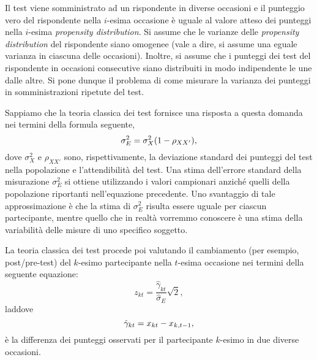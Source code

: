 Il test viene somministrato ad un rispondente in diverse occasioni e il punteggio vero del rispondente nella $i$-esima occasione è uguale al valore atteso dei punteggi nella $i$-esima \emph{propensity distribution}.
Si assume che le varianze delle \emph{propensity distribution} del rispondente siano omogenee (vale a dire, si assume una eguale varianza in ciascuna delle occasioni). 
Inoltre, si assume che i punteggi dei test del rispondente in occasioni consecutive siano distribuiti in modo indipendente le une dalle altre.
Si pone dunque il problema di come misurare la varianza dei punteggi in somministrazioni ripetute del test.

Sappiamo che la teoria classica dei test fornisce una risposta a questa domanda nei termini della formula seguente, 
\begin{equation}
\sigma^2_E = \sigma^2_X (1 - \rho_{XX'}), \notag
\end{equation}
dove $\sigma^2_X$ e $\rho_{XX'}$ sono, rispettivamente, la deviazione standard dei punteggi del test nella popolazione e l'attendibilità del test.
Una stima dell'errore standard della misurazione $\sigma^2_E$ si ottiene utilizzando i valori campionari anziché quelli della popolazione riportanti nell'equazione precedente.
Uno svantaggio di tale approssimazione è che la stima di $\sigma^2_E$ risulta essere uguale per ciascun partecipante, mentre quello che in realtà vorremmo conoscere è una stima della variabilità delle misure di uno specifico soggetto.

La teoria classica dei test procede poi valutando il cambiamento (per esempio, post/pre-test) del $k$-esimo partecipante nella $t$-esima occasione nei termini della seguente equazione:
\begin{equation}
z_{kt} = \frac{\hat{\gamma}_{kt}}{\hat{\sigma}_E} \sqrt{2}, 
\label{eq:Lord_Novick_1968_7_4}
\end{equation}
laddove 
\begin{equation}
\hat{\gamma}_{kt} = x_{kt} - x_{k, t-1}, \notag
\end{equation}
è la differenza dei punteggi osservati per il partecipante $k$-esimo in due diverse occasioni.

